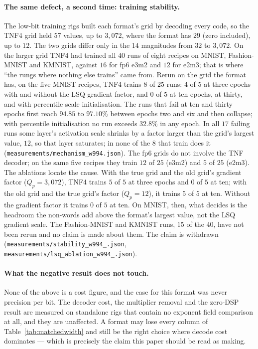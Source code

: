 \paragraph{The same defect, a second time: training stability.} The low-bit
training rigs built each format's grid by decoding every code, so the TNF4 grid
held $57$ values, up to $3{,}072$, where the format has $29$ (zero included), up
to $12$. The two grids differ only in the $14$ magnitudes from $32$ to $3{,}072$.
On the larger grid TNF4 had trained all $40$ runs of eight recipes on MNIST,
Fashion-MNIST and KMNIST, against $16$ for fp6 e3m2 and $12$ for e2m3; that is
where ``the rungs where nothing else trains'' came from. Rerun on the grid the
format has, on the five MNIST recipes, TNF4 trains $8$ of $25$ runs: $4$ of $5$
at three epochs with and without the LSQ gradient factor, and $0$ of $5$ at ten
epochs, at thirty, and with percentile scale initialisation. The runs that fail
at ten and thirty epochs first reach $94.85$ to $97.10\%$ between epochs two and
six and then collapse; with percentile initialisation no run exceeds $32.8\%$ in
any epoch. In all $17$ failing runs some layer's activation scale shrinks by a
factor larger than the grid's largest value, $12$, so that layer saturates; in
none of the $8$ that train does it (\texttt{measurements/\allowbreak mechanism\_\allowbreak w994.json}).
The fp6
grids do not involve the TNF decoder; on the same five recipes they train $12$
of $25$ (e3m2) and $5$ of $25$ (e2m3). The ablations locate the cause. With the
true grid and the old grid's gradient factor ($Q_p = 3{,}072$), TNF4 trains $5$
of $5$ at three epochs and $0$ of $5$ at ten; with the old grid and the true
grid's factor ($Q_p = 12$), it trains $5$ of $5$ at ten. Without the gradient
factor it trains $0$ of $5$ at ten. On MNIST, then, what decides is the headroom
the non-words add above the format's largest value, not the LSQ gradient scale.
The Fashion-MNIST and KMNIST runs, $15$ of the $40$, have not been rerun and no
claim is made about them. The claim is withdrawn
(\texttt{measurements/\allowbreak stability\_\allowbreak w994\_\allowbreak *.json},
\texttt{measurements/\allowbreak lsq\_\allowbreak ablation\_\allowbreak w994\_\allowbreak *.json}).

\paragraph{What the negative result does not touch.} None of the above is a
cost figure, and the case for this format was never precision per bit. The
decoder cost, the multiplier removal and the zero-DSP result are measured on
standalone rigs that contain no exponent field comparison at all, and they are
unaffected. A format may lose every column of
Table~\ref{tab:matchedwidth} and still be the right choice where decode cost
dominates --- which is precisely the claim this paper should be read as making.


